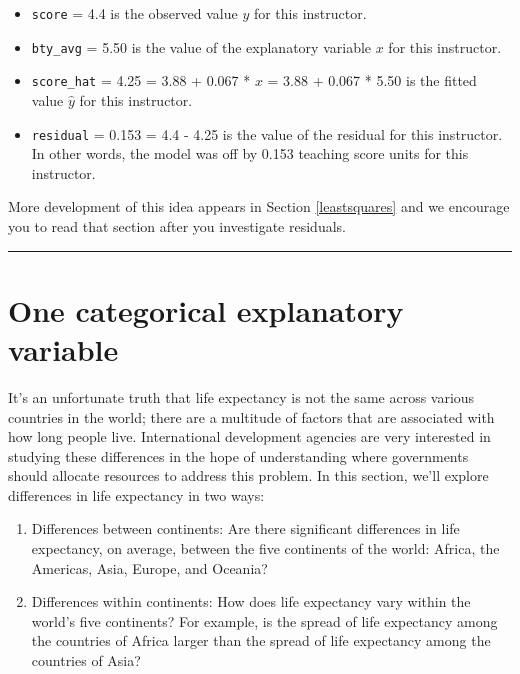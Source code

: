 \documentclass[12pt, krantz2,]{krantz}
\providecommand{\tightlist}{%
  \setlength{\itemsep}{0pt}\setlength{\parskip}{0pt}}
\begin{document}
\begin{itemize}
\tightlist
\item
  \texttt{score} = 4.4 is the observed value \(y\) for this instructor.
\item
  \texttt{bty\_avg} = 5.50 is the value of the explanatory variable \(x\) for this instructor.
\item
  \texttt{score\_hat} = 4.25 = 3.88 + 0.067 * \(x\) = 3.88 + 0.067 * 5.50 is the fitted value \(\widehat{y}\) for this instructor.
\item
  \texttt{residual} = 0.153 = 4.4 - 4.25 is the value of the residual for this instructor. In other words, the model was off by 0.153 teaching score units for this instructor.
\end{itemize}

More development of this idea appears in Section \ref{leastsquares} and we encourage you to read that section after you investigate residuals.

\begin{center}\rule{0.5\linewidth}{\linethickness}\end{center}

\hypertarget{model2}{%
\section{One categorical explanatory variable}\label{model2}}

It's an unfortunate truth that life expectancy is not the same across various countries in the world; there are a multitude of factors that are associated with how long people live. International development agencies are very interested in studying these differences in the hope of understanding where governments should allocate resources to address this problem. In this section, we'll explore differences in life expectancy in two ways:

\begin{enumerate}
\def\labelenumi{\arabic{enumi}.}
\tightlist
\item
  Differences between continents: Are there significant differences in life expectancy, on average, between the five continents of the world: Africa, the Americas, Asia, Europe, and Oceania?
\item
  Differences within continents: How does life expectancy vary within the world's five continents? For example, is the spread of life expectancy among the countries of Africa larger than the spread of life expectancy among the countries of Asia?
\end{enumerate}
\end{document}
